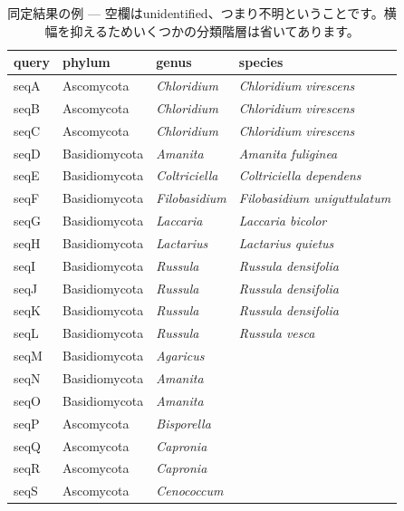 \documentclass[titlepage,10pt,a4paper,english]{jsbook}
\begin{document}
\begin{table}[h]
\begin{center}
\footnotesize\setlength{\baselineskip}{0.9em}%
\begin{tabular}{l|lll} 
query & phylum & genus & species \\\hline\hline
seqA & Ascomycota & \textit{Chloridium} & \textit{Chloridium virescens} \\
seqB & Ascomycota & \textit{Chloridium} & \textit{Chloridium virescens} \\
seqC & Ascomycota & \textit{Chloridium} & \textit{Chloridium virescens} \\
seqD & Basidiomycota & \textit{Amanita} & \textit{Amanita fuliginea} \\
seqE & Basidiomycota & \textit{Coltriciella} & \textit{Coltriciella dependens} \\
seqF & Basidiomycota & \textit{Filobasidium} & \textit{Filobasidium uniguttulatum} \\
seqG & Basidiomycota & \textit{Laccaria} & \textit{Laccaria bicolor} \\
seqH & Basidiomycota & \textit{Lactarius} & \textit{Lactarius quietus} \\
seqI & Basidiomycota & \textit{Russula} & \textit{Russula densifolia} \\
seqJ & Basidiomycota & \textit{Russula} & \textit{Russula densifolia} \\
seqK & Basidiomycota & \textit{Russula} & \textit{Russula densifolia} \\
seqL & Basidiomycota & \textit{Russula} & \textit{Russula vesca} \\
seqM & Basidiomycota & \textit{Agaricus} &  \\
seqN & Basidiomycota & \textit{Amanita} &  \\
seqO & Basidiomycota & \textit{Amanita} &  \\
seqP & Ascomycota & \textit{Bisporella} &  \\
seqQ & Ascomycota & \textit{Capronia} &  \\
seqR & Ascomycota & \textit{Capronia} &  \\
seqS & Ascomycota & \textit{Cenococcum} &  \\
\end{tabular}
\end{center}
\caption{同定結果の例 --- 空欄はunidentified、つまり不明ということです。横幅を抑えるためいくつかの分類階層は省いてあります。}
\label{table:exampleresultsofidentification}
\end{table}
\end{document}
